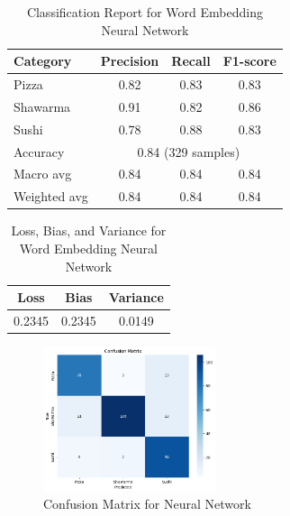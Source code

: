 \begin{itemize}
\begin{table}[h]
    \centering
    \begin{tabular}{lccc}
        \hline
        Category     & Precision                              & Recall & F1-score \\
        \hline
        Pizza        & 0.82                                   & 0.83   & 0.83     \\
        Shawarma     & 0.91                                   & 0.82   & 0.86     \\
        Sushi        & 0.78                                   & 0.88   & 0.83     \\
        \hline
        Accuracy     & \multicolumn{3}{c}{0.84 (329 samples)}                     \\
        Macro avg    & 0.84                                   & 0.84   & 0.84     \\
        Weighted avg & 0.84                                   & 0.84   & 0.84     \\
        \hline
    \end{tabular}
    \caption{Classification Report for Word Embedding Neural Network}
\end{table}

\begin{table}[h]
    \centering
    \begin{tabular}{ccc}
        \hline
        Loss   & Bias   & Variance \\
        \hline
        0.2345 & 0.2345 & 0.0149   \\
        \hline
    \end{tabular}
    \caption{Loss, Bias, and Variance for Word Embedding Neural Network}
\end{table}

\begin{figure}[h]
    \centering
    \includegraphics[width=0.45\textwidth]{params/neuralnetwork_confusion.png}
    \caption{Confusion Matrix for Neural Network}
\end{figure}


\end{itemize}
